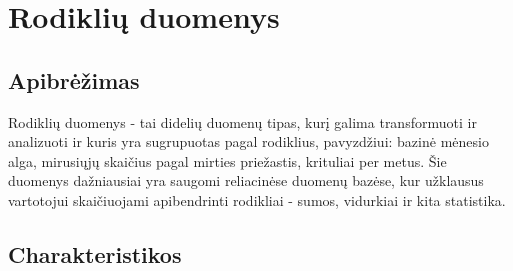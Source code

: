 \documentclass{VUMIFPSkursinis}
\begin{document}
\section{Rodiklių duomenys}

\subsection{Apibrėžimas}

Rodiklių duomenys - tai didelių duomenų tipas, kurį galima transformuoti ir analizuoti ir kuris yra sugrupuotas pagal rodiklius, 
pavyzdžiui: bazinė mėnesio alga, mirusiųjų skaičius pagal mirties priežastis, krituliai per metus. Šie duomenys dažniausiai yra saugomi reliacinėse duomenų bazėse, 
kur užklausus vartotojui skaičiuojami apibendrinti rodikliai - sumos, vidurkiai ir kita statistika.
\subsection{Charakteristikos}
\end{document}
